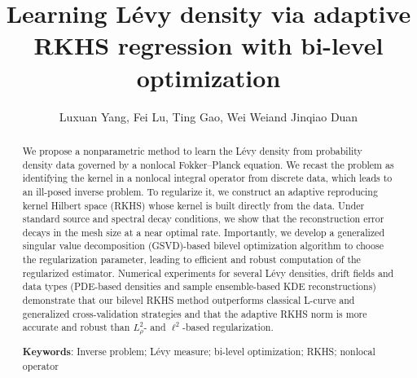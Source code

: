 \documentclass[12pt]{article}
\numberwithin{equation}{section}
\numberwithin{theorem}{section}
\newcommand\keywords[1]{\textbf{Keywords}: #1}
\begin{document}
\title{\textbf{Learning L\'evy density via adaptive RKHS regression with bi-level optimization
}}
\author{
Luxuan Yang\footnotemark[2]\;, 
Fei Lu\footnotemark[1]\;, 
Ting Gao\footnotemark[3]\;, Wei Wei\footnotemark[4] \;and Jinqiao Duan\footnotemark[5]
}
\date{}
\maketitle


\begin{abstract}

We propose a nonparametric method to learn the L\'evy density from probability density data governed by a nonlocal Fokker–Planck equation. We recast the problem as identifying the kernel in a nonlocal integral operator from discrete data, which leads to an ill-posed inverse problem. To regularize it, we construct an adaptive reproducing kernel Hilbert space (RKHS) whose kernel is built directly from the data. Under standard source and spectral decay conditions, we show that the reconstruction error decays in the mesh size at a near optimal rate. Importantly, we develop a generalized singular value decomposition (GSVD)-based bilevel optimization algorithm to choose the regularization parameter, leading to efficient and robust computation of the regularized estimator. Numerical experiments for several L\'evy densities, drift fields and data types (PDE-based densities and sample ensemble-based KDE reconstructions) demonstrate that our bilevel RKHS method outperforms classical L-curve and generalized cross-validation strategies and that the adaptive RKHS norm is more accurate and robust than $L^2_\rho$- and $\ell^2$-based regularization.

\vspace{2em}
\keywords{Inverse problem; L\'evy measure; bi-level optimization; RKHS; nonlocal operator}
\end{abstract}
\setcounter{tocdepth}{1}
\tableofcontents 
\end{document}
